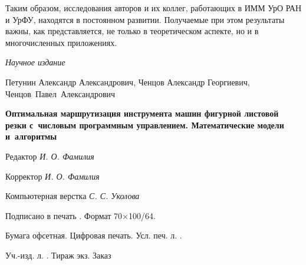 \documentclass[11pt,twoside,openany]{report}
\begin{document}
{{Таким образом,
исследования авторов и их коллег, работающих в ИММ УрО РАН и УрФУ,
находятся в постоянном развитии.
Получаемые при этом результаты важны,
как представляется,
не только в теоретическом аспекте,
но и в многочисленных приложениях.

\newpage
\toggletrue{bbx:gostbibliography}
\printbibliography[heading=bibintoc,title=Список используемых источников]

\makeatletter
\newcommand*{\cleartoleftpage}{%
  \clearpage
    \if@twoside
    \ifodd\c@page
      \hbox{}\thispagestyle{empty}\newpage
      \if@twocolumn
        \hbox{}\newpage
      \fi
    \fi
  \fi
}
\makeatother
\cleartoleftpage

\thispagestyle{empty}
\centering

\vspace{0pt plus2fill}
{\small\it
Научное издание
}

\vspace{0pt plus2fill}

Петунин Александр Александрович,
Ченцов Александр Георгиевич,
Ченцов~Павел~Александрович

\vspace{0pt plus1fill}

{\bf
Оптимальная маршрутизация инструмента машин фигурной
листовой резки с~числовым
программным управлением.
Математические модели и~алгоритмы
}

\vspace{0pt plus2fill}

Редактор {\it
И. О. Фамилия
}

Корректор {\it
И. О. Фамилия
}

Компьютерная верстка {\it
С. С. Уколова
}

\vspace{0pt plus1fill}

{\small
Подписано в печать \underline{\hspace{1cm}}.
Формат 70$\times$100/64.

Бумага офсетная.
Цифровая печать.
Усл. печ. л. \underline{\hspace{1cm}}.

Уч.-изд. л. \underline{\hspace{1cm}}.
Тираж \underline{\hspace{1cm}} экз.
Заказ \underline{\hspace{1cm}}

\vspace{0pt plus1fill}

}}}
\end{document}
